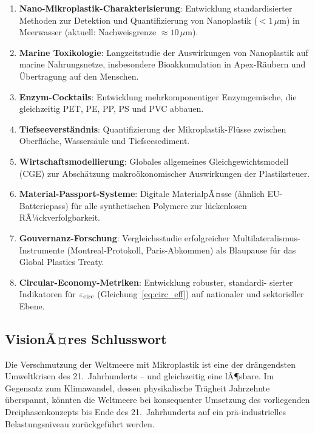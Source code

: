 ﻿\documentclass[12pt,a4paper]{article}
\theoremstyle{definition}
\theoremstyle{remark}
\newcommand{\MP}{Mikroplastik}
\newcommand{\NP}{Nanoplastik}
\begin{document}
\begin{enumerate}[leftmargin=*, label=\textbf{F\arabic*.}]
  \item \textbf{Nano-\MP{}-Charakterisierung}: Entwicklung standardisierter
        Methoden zur Detektion und Quantifizierung von \NP{}
        ($< 1\,\mu$m) in Meerwasser (aktuell: Nachweisgrenze $\approx 10\,\mu$m).
  \item \textbf{Marine Toxikologie}: Langzeitstudie der Auswirkungen von
        \NP{} auf marine Nahrungsnetze, insbesondere Bioakkumulation in
        Apex-R\"aubern und \"Ubertragung auf den Menschen.
  \item \textbf{Enzym-Cocktails}: Entwicklung mehrkomponentiger Enzymgemische,
        die gleichzeitig PET, PE, PP, PS und PVC abbauen.
  \item \textbf{Tiefseeverst\"andnis}: Quantifizierung der \MP{}-Fl\"usse
        zwischen Oberfl\"ache, Wassers\"aule und Tiefseesediment.
  \item \textbf{Wirtschaftsmodellierung}: Globales allgemeines Gleichgewichtsmodell
        (CGE) zur Absch\"atzung makro\"okonomischer Auswirkungen der Plastiksteuer.
  \item \textbf{Material-Passport-Systeme}: Digitale MaterialpÃ¤sse (\"ahnlich
        EU-Batteriepass) f\"ur alle synthetischen Polymere zur l\"uckenlosen
        RÃ¼ckverfolgbarkeit.
  \item \textbf{Gouvernanz-Forschung}: Vergleichsstudie erfolgreicher
        Multilateralismus-Instrumente (Montreal-Protokoll, Paris-Abkommen)
        als Blaupause f\"ur das Global Plastics Treaty.
  \item \textbf{Circular-Economy-Metriken}: Entwicklung robuster, standardi-
        sierter Indikatoren f\"ur $\varepsilon_{\rm circ}$ (Gleichung~\eqref{eq:circ_eff})
        auf nationaler und sektorieller Ebene.
\end{enumerate}

\subsection{VisionÃ¤res Schlusswort}

Die Verschmutzung der Weltmeere mit Mikroplastik ist eine der dr\"angendsten
Umweltkrisen des 21.~Jahrhunderts -- und gleichzeitig eine lÃ¶sbare.
Im Gegensatz zum Klimawandel, dessen physikalische Tr\"agheit Jahrzehnte
\"uberspannt, k\"onnten die Weltmeere bei konsequenter Umsetzung des
vorliegenden Dreiphasenkonzepts bis Ende des 21.~Jahrhunderts auf ein
pr\"a-industrielles Belastungsniveau zur\"uckgef\"uhrt werden.
\end{document}

